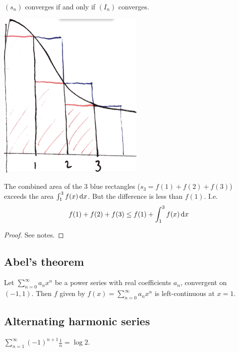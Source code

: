 \begin{corollary*}
  $(s_n)$ converges if and only if $(I_n)$ converges.
\end{corollary*}

\begin{intuition*}\hspace{0pt}
  \begin{mdframed}
    \includegraphics[width=200pt]{img/analysis--integral-test-theorem.png}

    The combined area of the 3 blue rectangles ($s_3 = f(1) + f(2) + f(3)$) exceeds the area
    $\int_1^3 f(x) \dx$. But the difference is less than $f(1)$. I.e.
    \begin{align*}
      f(1) + f(2) + f(3) \leq f(1) + \int_1^3 f(x) \dx
    \end{align*}


  \end{mdframed}
\end{intuition*}

\begin{proof}
  See notes.
\end{proof}



\subsection{Abel's theorem}
\begin{theorem*}
  Let $\sum_{n=0}^\infty a_nx^n$ be a power series with real coefficients $a_n$, convergent on
  $(-1, 1)$. Then $f$ given by $f(x) = \sum_{n=0}^\infty a_nx^n$ is left-continuous at $x=1$.
\end{theorem*}

\subsection{Alternating harmonic series}
\begin{theorem*}
  $\sum_{n=1}^\infty (-1)^{n+1}\frac{1}{n} = \log 2$.
\end{theorem*}

